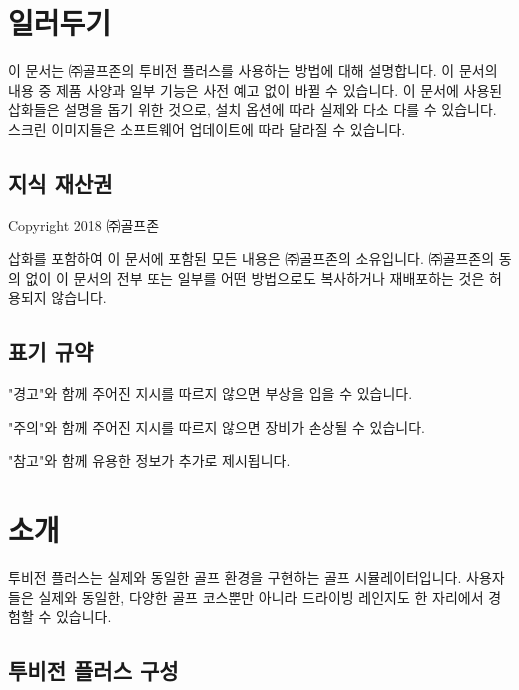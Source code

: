\documentclass[10pt, openright, language=korean]{hzguide}
\begin{document}
\frontmatter* 

\FrontCover

\tableofcontents*

\chapter{일러두기}

이 문서는 ㈜골프존의 투비전 플러스를 사용하는 방법에 대해 설명합니다. 이 문서의 내용 중 제품 사양과 일부 기능은 사전 예고 없이 바뀔 수 있습니다. 이 문서에 사용된 삽화들은 설명을 돕기 위한 것으로, 설치 옵션에 따라 실제와 다소 다를 수 있습니다. 스크린 이미지들은 소프트웨어 업데이트에 따라 달라질 수 있습니다.

\section{지식 재산권}

Copyright 2018 ㈜골프존

삽화를 포함하여 이 문서에 포함된 모든 내용은 ㈜골프존의 소유입니다. ㈜골프존의 동의 없이 이 문서의 전부 또는 일부를 어떤 방법으로도 복사하거나 재배포하는 것은 허용되지 않습니다.

\section{표기 규약}

\begin{Warning}
"경고"와 함께 주어진 지시를 따르지 않으면 부상을 입을 수 있습니다.
\end{Warning}

\begin{Caution}
"주의"와 함께 주어진 지시를 따르지 않으면 장비가 손상될 수 있습니다.
\end{Caution}

\begin{Note}
"참고"와 함께 유용한 정보가 추가로 제시됩니다.
\end{Note}

\mainmatter*

\chapter{소개}

투비전 플러스는 실제와 동일한 골프 환경을 구현하는 골프 시뮬레이터입니다.
사용자들은 실제와 동일한, 다양한 골프 코스뿐만 아니라 드라이빙 레인지도 한 자리에서 경험할 수 있습니다.

\section{투비전 플러스 구성}
\end{document}
